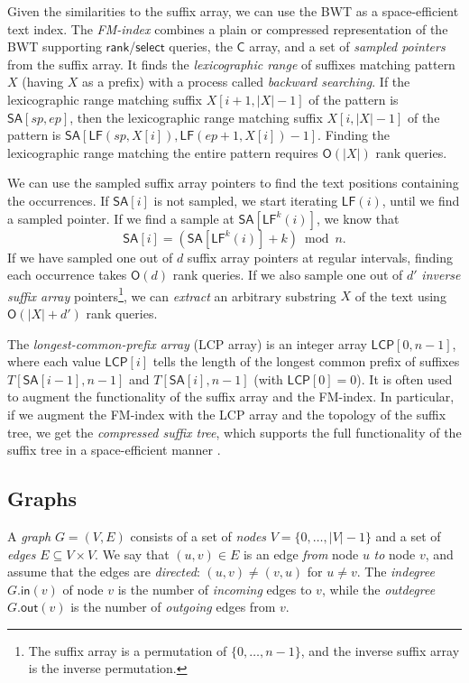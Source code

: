 \documentclass[a4paper,UKenglish]{lipics-v2016}
\newcommand{\set}[1]{\ensuremath{\{ #1 \}}}
\newcommand{\abs}[1]{\ensuremath{\lvert #1 \rvert}}
\newcommand{\Oh}[1]{\ensuremath{\mathsf{O}\!\left( #1 \right)}}
\newcommand{\rank}{\ensuremath{\mathsf{rank}}}
\newcommand{\select}{\ensuremath{\mathsf{select}}}
\newcommand{\LF}{\ensuremath{\mathsf{LF}}}
\newcommand{\gindegree}{\ensuremath{\mathsf{in}}}
\newcommand{\goutdegree}{\ensuremath{\mathsf{out}}}
\newcommand{\FMindex}{FM\nobreakdash-index}
\newcommand{\SA}{\ensuremath{\mathsf{SA}}}
\newcommand{\Carray}{\ensuremath{\mathsf{C}}}
\newcommand{\LCP}{\ensuremath{\mathsf{LCP}}}
\begin{document}
Given the similarities to the suffix array, we can use the BWT as a space-efficient text index. The \emph{\FMindex} \cite{Ferragina2005a} combines a plain or compressed representation of the BWT supporting $\rank$/$\select$ queries, the $\Carray$ array, and a set of \emph{sampled pointers} from the suffix array. It finds the \emph{lexicographic range} of suffixes matching pattern $X$ (having $X$ as a prefix) with a process called \emph{backward searching}. If the lexicographic range matching suffix $X[i+1, \abs{X}-1]$ of the pattern is $\SA[sp, ep]$, then the lexicographic range matching suffix $X[i, \abs{X}-1]$ of the pattern is $\SA[\LF(sp, X[i]), \LF(ep+1, X[i]) - 1]$. Finding the lexicographic range matching the entire pattern requires $\Oh{\abs{X}}$ rank queries.

We can use the sampled suffix array pointers to find the text positions containing the occurrences. If $\SA[i]$ is not sampled, we start iterating $\LF(i)$, until we find a sampled pointer. If we find a sample at $\SA[\LF^{k}(i)]$, we know that
$$
\SA[i] = (\SA[\LF^{k}(i)] + k) \bmod n.
$$
If we have sampled one out of $d$ suffix array pointers at regular intervals, finding each occurrence takes $\Oh{d}$ rank queries. If we also sample one out of $d'$ \emph{inverse suffix array} pointers\footnote{The suffix array is a permutation of $\set{0, \dotsc, n-1}$, and the inverse suffix array is the inverse permutation.}, we can \emph{extract} an arbitrary substring $X$ of the text using $\Oh{\abs{X}+d'}$ rank queries.

The \emph{longest-common-prefix array} (LCP array) \cite{Manber1993} is an integer array $\LCP[0, n-1]$, where each value $\LCP[i]$ tells the length of the longest common prefix of suffixes $T[\SA[i-1], n-1]$ and $T[\SA[i], n-1]$ (with $\LCP[0] = 0$). It is often used to augment the functionality of the suffix array and the \FMindex. In particular, if we augment the \FMindex{} with the LCP array and the topology of the suffix tree, we get the \emph{compressed suffix tree}, which supports the full functionality of the suffix tree in a space-efficient manner \cite{Sadakane2007}.

\subsection{Graphs}\label{sect:graphs}

A \emph{graph} $G = (V, E)$ consists of a set of \emph{nodes} $V = \set{0, \dotsc, \abs{V}-1}$ and a set of \emph{edges} $E \subseteq V \times V$. We say that $(u, v) \in E$ is an edge \emph{from} node $u$ \emph{to} node $v$, and assume that the edges are \emph{directed}: $(u, v) \ne (v, u)$ for $u \ne v$. The \emph{indegree} $G.\gindegree(v)$ of node $v$ is the number of \emph{incoming} edges to $v$, while the \emph{outdegree} $G.\goutdegree(v)$ is the number of \emph{outgoing} edges from $v$.
\end{document}
